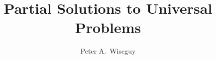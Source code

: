 \documentclass[master,english,smartquotes]{hgbthesis}
\title{Partial Solutions to Universal Problems}
\author{Peter A.\ Wiseguy}
\begin{document}

\frontmatter							%

\maketitle
\tableofcontents




\mainmatter          			%










\appendix                                         %


\MakeBibliography                        				%



\end{document}
